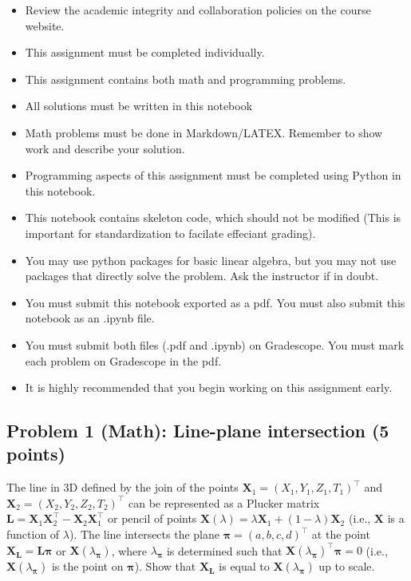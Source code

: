 \documentclass[11pt]{article}
\providecommand{\tightlist}{%
      \setlength{\itemsep}{0pt}\setlength{\parskip}{0pt}}
\begin{document}
\begin{itemize}
\tightlist
\item
  Review the academic integrity and collaboration policies on the course
  website.
\item
  This assignment must be completed individually.
\item
  This assignment contains both math and programming problems.
\item
  All solutions must be written in this notebook
\item
  Math problems must be done in Markdown/LATEX. Remember to show work
  and describe your solution.
\item
  Programming aspects of this assignment must be completed using Python
  in this notebook.
\item
  This notebook contains skeleton code, which should not be modified
  (This is important for standardization to facilate effeciant grading).
\item
  You may use python packages for basic linear algebra, but you may not
  use packages that directly solve the problem. Ask the instructor if in
  doubt.
\item
  You must submit this notebook exported as a pdf. You must also submit
  this notebook as an .ipynb file.
\item
  You must submit both files (.pdf and .ipynb) on Gradescope. You must
  mark each problem on Gradescope in the pdf.
\item
  It is highly recommended that you begin working on this assignment
  early.
\end{itemize}

    \hypertarget{problem-1-math-line-plane-intersection-5-points}{%
\subsection{Problem 1 (Math): Line-plane intersection (5
points)}\label{problem-1-math-line-plane-intersection-5-points}}

The line in 3D defined by the join of the points
\(\boldsymbol{X}_1 = (X_1,  Y_1, Z_1, T_1)^\top\) and
\(\boldsymbol{X}_2 = (X_2, Y_2, Z_2, T_2)^\top\) can be represented as a
Plucker matrix
\(\boldsymbol{L} = \boldsymbol{X}_1  \boldsymbol{X}_2^\top - \boldsymbol{X}_2 \boldsymbol{X}_1^\top\)
or pencil of points
\(\boldsymbol{X}(\lambda) = \lambda \boldsymbol{X}_1 + (1 - \lambda) \boldsymbol{X}_2\)
(i.e., \(\boldsymbol{X}\) is a function of \(\lambda\)). The line
intersects the plane \(\boldsymbol{\pi} = (a, b, c, d)^\top\) at the
point
\(\boldsymbol{X}_{\boldsymbol{L}} = \boldsymbol{L} \boldsymbol{\pi}\) or
\(\boldsymbol{X}(\lambda_{\boldsymbol{\pi}})\), where
\(\lambda_{\boldsymbol{\pi}}\) is determined such that
\(\boldsymbol{X}(\lambda_{\boldsymbol{\pi}})^\top \boldsymbol{\pi} =  0\)
(i.e., \(\boldsymbol{X}(\lambda_{\boldsymbol{\pi}})\) is the point on
\(\boldsymbol{\pi}\)). Show that \(\boldsymbol{X}_{\boldsymbol{L}}\) is
equal to \(\boldsymbol{X}(\lambda_{\boldsymbol{\pi}})\) up to scale.
\end{document}
